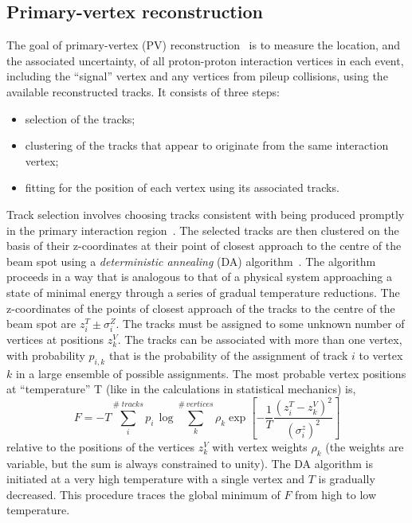 \subsection*{Primary-vertex reconstruction}
The goal of primary-vertex (PV) reconstruction~\cite{Speer:927395}  is to measure the location, and the associated
uncertainty, of all proton-proton interaction vertices in each event, including the ``signal'' vertex
and any vertices from pileup collisions, using the available reconstructed tracks.  
It consists of three steps: 
\begin{itemize} 
\item  selection of the tracks;
\item clustering of the tracks that appear to originate from the same interaction vertex;
\item fitting for the position of each vertex using its associated tracks.
\end{itemize}
Track selection involves choosing tracks consistent with being produced promptly in the primary interaction region~\cite{Chatrchyan:2014fea}.
The selected tracks are then clustered on the basis of their z-coordinates at their point of closest approach to the centre of the beam spot  using a
\textit{deterministic annealing} (DA) algorithm~\cite{726788}. 
The algorithm proceeds in a way that is analogous to that of a physical system approaching a state of minimal energy through a series of
gradual  temperature  reductions. 
The z-coordinates  of  the  points  of  closest  approach  of  the tracks to the centre of the beam spot are $z_i^T \pm \sigma_i^Z$.
 The tracks must be assigned to some unknown number of vertices at positions $z_k^V$.
The tracks can be associated with more than one vertex, with probability $p_{i,k}$ that is  the probability of the
assignment of track $i$ to vertex $k$ in a large ensemble of possible assignments.
 The most probable vertex positions at ``temperature'' T (like in the calculations in statistical mechanics) is,
\begin{equation}
F=-T \sum_{i}^{\# \; tracks} p_i \, \log \sum_{k}^{\# \, vertices} \rho_k  \exp [-\frac{1}{T} \frac{(z_i^T-z_k^V)^2}{(\sigma_i^z)^2}  ]
\end{equation}
 relative to the positions of the vertices $z_k^V$ with vertex weights $\rho_k$ (the weights are variable, but the sum is always constrained
to unity).
The DA algorithm is initiated at a very high temperature with a single vertex and $T$ is gradually decreased.
This procedure traces the global minimum of $F$ from high to low temperature.
